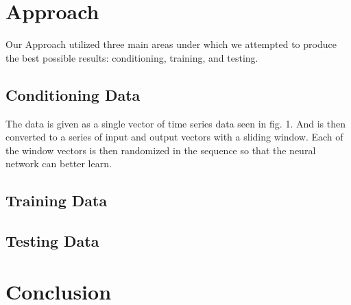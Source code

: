 \documentclass[conference]{IEEEtran}
\begin{document}
\section{Approach}
Our Approach utilized three main areas under which we attempted to produce the best possible results: conditioning, training, and testing.

\subsection{Conditioning Data}
The data is given as a single vector of time series data seen in fig. 1. And is then converted to a series of input and output vectors with a sliding window. Each of the window vectors is then randomized in the sequence so that the neural network can better learn. 

\subsection{Training Data}


\subsection{Testing Data}









\section{Conclusion}


\begin{IEEEbiography}


\end{IEEEbiography}
\end{document}
